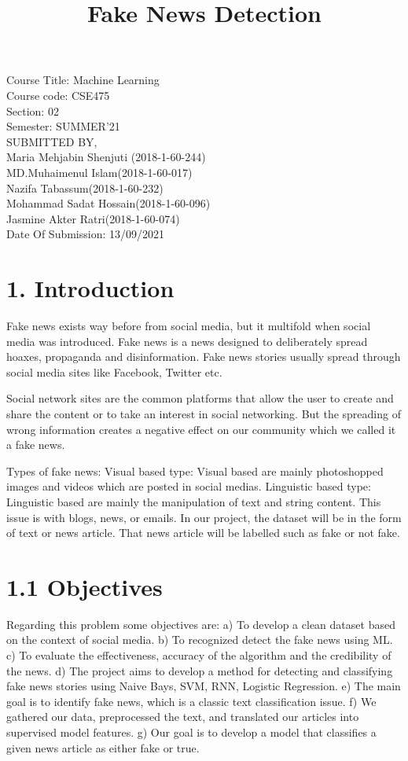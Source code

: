 \documentclass[12pt]{article}
\begin{document}
\title{Fake News Detection}
\date{}
\maketitle
\date{}
\section*{}
Course Title: Machine Learning\\
Course code: CSE475\\
Section: 02\\
Semester: SUMMER’21\\
\newline
SUBMITTED BY,\\
\newline
Maria Mehjabin Shenjuti (2018-1-60-244)\\
MD.Muhaimenul Islam(2018-1-60-017)\\
Nazifa Tabassum(2018-1-60-232)\\
Mohammad Sadat Hossain(2018-1-60-096)\\
Jasmine Akter Ratri(2018-1-60-074)\\
Date Of Submission: 13/09/2021
\newpage
\section*{1. Introduction}
Fake news exists way before from social media, but it multifold when social media was introduced.
Fake news is a news designed to deliberately spread hoaxes, propaganda and disinformation.
Fake news stories usually spread through social media sites like Facebook, Twitter etc.

Social network sites are the common platforms that allow the user to create and share the content or to take an interest in social networking. But the spreading of wrong information creates a negative effect on our community which we called it a fake news.

Types of fake news:
Visual based type: 
Visual based are mainly photoshopped images and videos which are posted in social medias.
Linguistic based type:
Linguistic based are mainly the manipulation of text and string content. This issue is with blogs, news, or emails.
In our project, the dataset will be in the form of text or news article. That news article will be labelled such as fake or not fake.

\section*{1.1 Objectives}
Regarding this problem some objectives are:
a)  To develop a clean dataset based on the context of social media.
b) To recognized detect the fake news using ML.
c) To evaluate the effectiveness, accuracy of the algorithm and the credibility of the news.
d) The project aims to develop a method for detecting and classifying fake news stories using Naive Bays, SVM, RNN, Logistic Regression.
e) The main goal is to identify fake news, which is a classic text classification issue.
f)  We gathered our data, preprocessed the text, and translated our articles into supervised model features.
g) Our goal is to develop a model that classifies a given news article as either fake or true.
\end{document}

